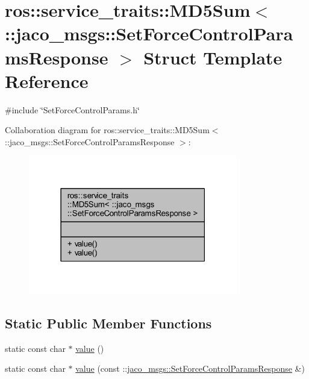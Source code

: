 \hypertarget{structros_1_1service__traits_1_1MD5Sum_3_01_1_1jaco__msgs_1_1SetForceControlParamsResponse_01_4}{}\section{ros\+:\+:service\+\_\+traits\+:\+:M\+D5\+Sum$<$ \+:\+:jaco\+\_\+msgs\+:\+:Set\+Force\+Control\+Params\+Response $>$ Struct Template Reference}
\label{structros_1_1service__traits_1_1MD5Sum_3_01_1_1jaco__msgs_1_1SetForceControlParamsResponse_01_4}


{\ttfamily \#include \char`\"{}Set\+Force\+Control\+Params.\+h\char`\"{}}



Collaboration diagram for ros\+:\+:service\+\_\+traits\+:\+:M\+D5\+Sum$<$ \+:\+:jaco\+\_\+msgs\+:\+:Set\+Force\+Control\+Params\+Response $>$\+:
\nopagebreak
\begin{figure}[H]
\begin{center}
\leavevmode
\includegraphics[width=259pt]{d4/dd6/structros_1_1service__traits_1_1MD5Sum_3_01_1_1jaco__msgs_1_1SetForceControlParamsResponse_01_4__coll__graph}
\end{center}
\end{figure}
\subsection*{Static Public Member Functions}
\begin{DoxyCompactItemize}
\item 
static const char $\ast$ \hyperlink{structros_1_1service__traits_1_1MD5Sum_3_01_1_1jaco__msgs_1_1SetForceControlParamsResponse_01_4_ac521c37888d4da291998c0d19be0583b}{value} ()
\item 
static const char $\ast$ \hyperlink{structros_1_1service__traits_1_1MD5Sum_3_01_1_1jaco__msgs_1_1SetForceControlParamsResponse_01_4_af264507d4fc54f3d56e5f75b0d52f468}{value} (const \+::\hyperlink{namespacejaco__msgs_afebda443b838c4657280c3c24ba107ba}{jaco\+\_\+msgs\+::\+Set\+Force\+Control\+Params\+Response} \&)
\end{DoxyCompactItemize}


